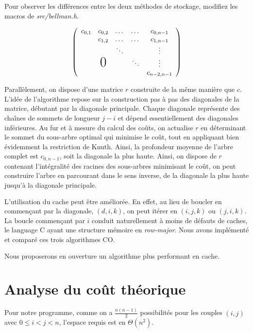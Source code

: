 \documentclass[a4paper, 10pt, french]{article}
\begin{document}
Pour observer les différences entre les deux méthodes de stockage, modifiez les macros de {\em src/bellman.h}.

\par\leavevmode\par
\[
  \left(
  \begin{array}{ccccc}
      c_{0,1} & c_{0,2}       & \dots  & \dots  & c_{0,n-1}   \\
              & c_{1,2}       & \dots  & \dots  & c_{1,n-1}   \\
              &               & \ddots &        & \vdots      \\
              & \text{\huge0} &        & \ddots & \vdots      \\
              &               &        &        & c_{n-2,n-1}
    \end{array}
  \right)
\]
\par\leavevmode\par
Parallèlement, on dispose d'une matrice $r$ construite de la même manière que $c$. L'idée de l'algorithme repose sur la construction pas à pas des diagonales de la matrice, débutant par la diagonale principale. Chaque diagonale représente des chaînes de sommets de longueur $j - i$ et dépend essentiellement des diagonales inférieures. Au fur et à mesure du calcul des coûts, on actualise $r$ en déterminant le sommet du sous-arbre optimal qui minimise le coût, tout en appliquant bien évidemment la restriction de Knuth. Ainsi, la profondeur moyenne de l'arbre complet est $c_{0,n-1}$, soit la diagonale la plus haute.
Ainsi, on dispose de $r$ contenant l'intégralité des racines des sous-arbres minimisant le coût, on peut construire l'arbre en parcourant dans le sens inverse, de la diagonale la plus haute jusqu'à la diagonale principale.

L'utilisation du cache peut être améliorée. En effet, au lieu de boucler en commençant par la diagonale, $(d, i, k)$, on peut itérer en $(i, j, k)$ ou $(j, i, k)$. La boucle commençant par $i$ conduit naturellement à moins de défauts de caches, le language C ayant une structure mémoire en {\em row-major}. Nous avons implémenté et comparé ces trois algorithmes CO.

Nous proposerons en ouverture un algorithme plus performant en cache.
\section{Analyse du coût théorique}
Pour notre programme, comme on a $\frac{n(n-1)}{2}$ possibilités pour les couples $(i, j)$ avec $0 \leq i < j < n$, l'espace requis est en $\Theta(n^2)$.
\end{document}
